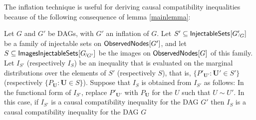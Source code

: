 The inflation technique is useful for deriving causal compatibility inequalities because of the following consequence of  lemma \ref{mainlemma}:

\begin{corollary} \label{maincorollary}
Let $G$ and $G'$ be DAGs, with $G'$ an inflation of $G$.    Let $S'  \subseteq {\operatorname{\mathsf{InjectableSets}}_{}}\lbrack{G'}_{\!\!^{/\!}G}\rbrack$ be a family of injectable sets on ${\operatorname{\mathsf{ObservedNodes}}_{}}\lbrack G'\rbrack$, and let $S \subseteq {\operatorname{\mathsf{ImagesInjectableSets}}_{}}\lbrack{G}_{\!^{/\!}G'}\rbrack$ be the images on ${\operatorname{\mathsf{ObservedNodes}}_{}}\lbrack G\rbrack$ of this family. 
  Let $I_{S'}$ (respectively $I_{S}$) be an inequality that is evaluated on the marginal distributions over the elements of $S'$ (respectively $S$), that is, $ \{ P'_{\bm{U}'} : \bm{U}' \in S'\}$ (respectively $\{ P_{\bm{U}} : \bm{U} \in S\}$).  Suppose that $I_S$ is obtained from $I_{S'}$ as follows: In the functional form of $I_{S'}$, replace $P'_{\bm{U}'}$ with $P_{\bm{U}}$ for the $U$ such that $U \sim U'$.  In this case, if $I_{S'}$ is a causal compatibility inequality for the DAG $G'$ then $I_{S}$ is a causal compatibility inequality for the DAG $G$
\end{corollary}


